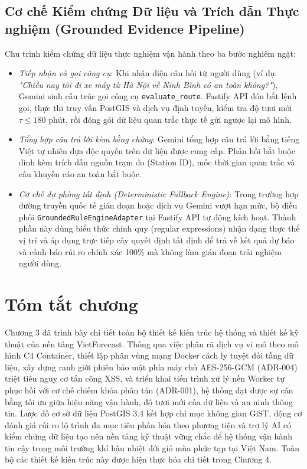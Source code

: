 \subsection{Cơ chế Kiểm chứng Dữ liệu và Trích dẫn Thực nghiệm (Grounded Evidence Pipeline)}
Chu trình kiểm chứng dữ liệu thực nghiệm vận hành theo ba bước nghiêm ngặt:
\begin{itemize}
    \item[-] \textit{Tiếp nhận và gọi công cụ}: Khi nhận diện câu hỏi từ người dùng (ví dụ: \textit{"Chiều nay tôi đi xe máy từ Hà Nội về Ninh Bình có an toàn không?"}), Gemini sinh cấu trúc gọi công cụ \texttt{evaluate\_route}. Fastify API đón bắt lệnh gọi, thực thi truy vấn PostGIS và dịch vụ định tuyến, kiểm tra độ tươi mới $\tau \le 180\text{ phút}$, rồi đóng gói dữ liệu quan trắc thực tế gửi ngược lại mô hình.
    \item[-] \textit{Tổng hợp câu trả lời kèm bằng chứng}: Gemini tổng hợp câu trả lời bằng tiếng Việt tự nhiên dựa độc quyền trên dữ liệu được cung cấp. Phản hồi bắt buộc đính kèm trích dẫn nguồn trạm đo (Station ID), mốc thời gian quan trắc và câu khuyến cáo an toàn bắt buộc.
    \item[-] \textit{Cơ chế dự phòng tất định (Deterministic Fallback Engine)}: Trong trường hợp đường truyền quốc tế gián đoạn hoặc dịch vụ Gemini vượt hạn mức, bộ điều phối \texttt{GroundedRuleEngineAdapter} tại Fastify API tự động kích hoạt. Thành phần này dùng biểu thức chính quy (regular expressions) nhận dạng thực thể vị trí và áp dụng trực tiếp cây quyết định tất định để trả về kết quả dự báo và cảnh báo rủi ro chính xác 100\% mà không làm gián đoạn trải nghiệm người dùng.
\end{itemize}

\section{Tóm tắt chương}
\label{sec:chapter3_summary}
Chương 3 đã trình bày chi tiết toàn bộ thiết kế kiến trúc hệ thống và thiết kế kỹ thuật của nền tảng VietForecast. Thông qua việc phân rã dịch vụ vi mô theo mô hình C4 Container, thiết lập phân vùng mạng Docker cách ly tuyệt đối tầng dữ liệu, xây dựng ranh giới phiên bảo mật phía máy chủ AES-256-GCM (ADR-004) triệt tiêu nguy cơ tấn công XSS, và triển khai tiến trình xử lý nền Worker tự phục hồi với cơ chế chiếm khóa phân tán (ADR-001), hệ thống đạt được sự cân bằng tối ưu giữa hiệu năng vận hành, độ tươi mới của dữ liệu và an ninh thông tin. Lược đồ cơ sở dữ liệu PostGIS 3.4 kết hợp chỉ mục không gian GiST, động cơ đánh giá rủi ro lộ trình đa mục tiêu phân hóa theo phương tiện và trợ lý AI có kiểm chứng dữ liệu tạo nên nền tảng kỹ thuật vững chắc để hệ thống vận hành tin cậy trong môi trường khí hậu nhiệt đới gió mùa phức tạp tại Việt Nam. Toàn bộ các thiết kế kiến trúc này được hiện thực hóa chi tiết trong Chương 4.
